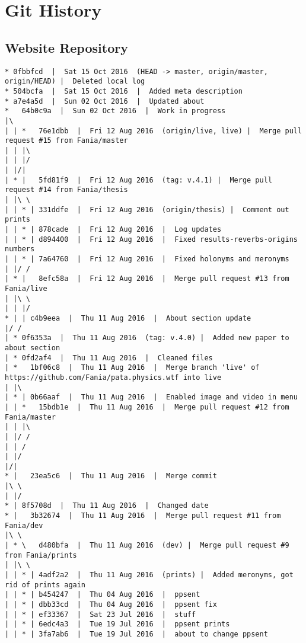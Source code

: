 
\chapter{Git History}
\label{app:git}


\section{Website Repository}

\begin{verbatim}
* 0fbbfcd  |  Sat 15 Oct 2016  (HEAD -> master, origin/master, origin/HEAD) |  Deleted local log
* 504bcfa  |  Sat 15 Oct 2016  |  Added meta description
* a7e4a5d  |  Sun 02 Oct 2016  |  Updated about
*   64b0c9a  |  Sun 02 Oct 2016  |  Work in progress
|\  
| | *   76e1dbb  |  Fri 12 Aug 2016  (origin/live, live) |  Merge pull request #15 from Fania/master
| | |\  
| | |/  
| |/|   
| * |   5fd81f9  |  Fri 12 Aug 2016  (tag: v.4.1) |  Merge pull request #14 from Fania/thesis
| |\ \  
| | * | 331ddfe  |  Fri 12 Aug 2016  (origin/thesis) |  Comment out prints
| | * | 878cade  |  Fri 12 Aug 2016  |  Log updates
| | * | d894400  |  Fri 12 Aug 2016  |  Fixed results-reverbs-origins numbers
| | * | 7a64760  |  Fri 12 Aug 2016  |  Fixed holonyms and meronyms
| |/ /  
| * |   8efc58a  |  Fri 12 Aug 2016  |  Merge pull request #13 from Fania/live
| |\ \  
| | |/  
* | | c4b9eea  |  Thu 11 Aug 2016  |  About section update
|/ /  
| * 0f6353a  |  Thu 11 Aug 2016  (tag: v.4.0) |  Added new paper to about section
| * 0fd2af4  |  Thu 11 Aug 2016  |  Cleaned files
| *   1bf06c8  |  Thu 11 Aug 2016  |  Merge branch 'live' of https://github.com/Fania/pata.physics.wtf into live
| |\  
| * | 0b66aaf  |  Thu 11 Aug 2016  |  Enabled image and video in menu
| | *   15bdb1e  |  Thu 11 Aug 2016  |  Merge pull request #12 from Fania/master
| | |\  
| |/ /  
| | /   
| |/    
|/|     
* |   23ea5c6  |  Thu 11 Aug 2016  |  Merge commit
|\ \  
| |/  
* | 8f5708d  |  Thu 11 Aug 2016  |  Changed date
* |   3b32674  |  Thu 11 Aug 2016  |  Merge pull request #11 from Fania/dev
|\ \  
| * \   d480bfa  |  Thu 11 Aug 2016  (dev) |  Merge pull request #9 from Fania/prints
| |\ \  
| | * | 4adf2a2  |  Thu 11 Aug 2016  (prints) |  Added meronyms, got rid of prints again
| | * | b454247  |  Thu 04 Aug 2016  |  ppsent
| | * | dbb33cd  |  Thu 04 Aug 2016  |  ppsent fix
| | * | ef33367  |  Sat 23 Jul 2016  |  stuff
| | * | 6edc4a3  |  Tue 19 Jul 2016  |  ppsent prints
| | * | 3fa7ab6  |  Tue 19 Jul 2016  |  about to change ppsent

\end{verbatim}
